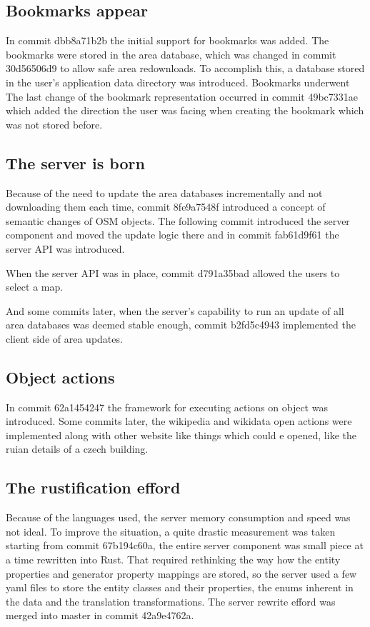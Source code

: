 \documentclass[nolof,digital]{fithesis3}
\begin{document}
\subsection{Bookmarks appear}
In commit dbb8a71b2b the initial support for bookmarks was added. The bookmarks were stored in the area database, which was changed in commit 30d56506d9 to allow safe area redownloads. To accomplish this, a database stored in the user's application data directory was introduced. Bookmarks underwent The last change of the bookmark representation occurred in commit 49bc7331ae which added the direction the user was facing when creating the bookmark which was not stored before.
\subsection{The server is born}
Because of the need to update the area databases incrementally and not downloading them each time, commit 8fe9a7548f introduced a concept of semantic changes of OSM objects. The following commit introduced the server component and moved the update logic there and in commit fab61d9f61 the server API was introduced.

When the server API was in place, commit d791a35bad allowed the users to select a map. 

And some commits later, when the server's capability to run an update of all area databases was deemed stable enough, commit b2fd5c4943 implemented the client side of area updates.
\subsection{Object actions}
In commit 62a1454247 the framework for executing actions on object was introduced. Some commits later, the wikipedia and wikidata open actions were implemented along with other website like things which could e opened, like the ruian details of a czech building.
\subsection{The rustification efford}
Because of the languages used, the server memory consumption and speed was not ideal. To improve the situation, a quite drastic measurement was taken starting from commit 67b194c60a, the entire server component was small piece at a time rewritten into Rust. That required rethinking the way how the entity properties and generator property mappings are stored, so the server used a few yaml files to store the entity classes and their properties, the enums inherent in the data and the translation transformations. The server rewrite efford was merged into master in commit 42a9e4762a.
\end{document}
